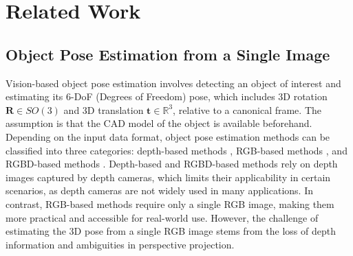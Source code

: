 \section{Related Work}
\label{sec:Related}

\subsection{Object Pose Estimation from a Single Image}

Vision-based object pose estimation involves detecting an object of interest and estimating its 6-DoF (Degrees of Freedom) pose, which includes 3D rotation $\mathbf{R} \in SO(3)$ and 3D translation $\mathbf{t} \in \mathbb{R}^3$, relative to a canonical frame. The assumption is that the CAD model of the object is available beforehand. Depending on the input data format, object pose estimation methods can be classified into three categories: depth-based methods \cite{wang20216d, gao20206d, guo2021efficient, hoang2022voting}, RGB-based methods \cite{billings2019silhonet, peng2019pvnet, wang2021gdr}, and RGBD-based methods \cite{wang2019densefusion, he2020pvn3d, hong2024rdpn6d}. Depth-based and RGBD-based methods rely on depth images captured by depth cameras, which limits their applicability in certain scenarios, as depth cameras are not widely used in many applications. In contrast, RGB-based methods require only a single RGB image, making them more practical and accessible for real-world use. However, the challenge of estimating the 3D pose from a single RGB image stems from the loss of depth information and ambiguities in perspective projection.


